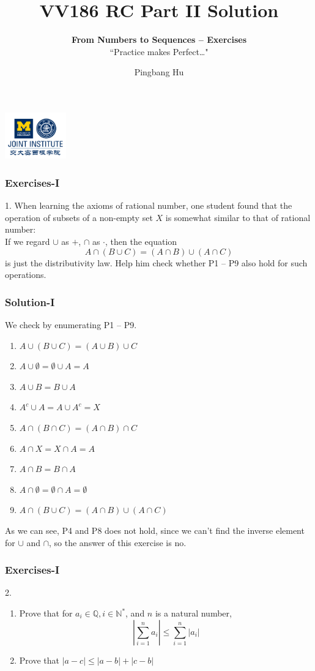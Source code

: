 \documentclass[12pt, t]{beamer}
\title{VV186 RC Part II Solution}
\subtitle{\textbf{From Numbers to Sequences -- Exercises}\\``Practice makes Perfect\dots"}
\institute[UM-SJTU JI]{University of Michigan-Shanghai Jiao Tong University Joint Institute}
\author{Pingbang Hu}
\renewcommand{\emph}[1]{{\color{Turquoise3}\textsl{#1}}}
\begin{document}
\begin{frame}
    \titlepage
    \begin{center}
        \includegraphics[height=2cm]{Figures/logo/logo2.png}
    \end{center}
\end{frame}

\begin{frame}
    \frametitle{Exercises-I}
1. When learning the axioms of rational number, one student found that the operation of subsets of a non-empty 
set $X$ is somewhat similar to that of rational number:\\
\vspace{1em}
If we regard $\cup$ as $+$, $\cap$ as $\cdot$, then the equation 
\begin{equation*}
    A\cap(B\cup C)=(A\cap B)\cup(A\cap C)
\end{equation*}
is just the distributivity law. Help him  check whether P1 -- P9 also hold for such operations.
\end{frame}

\begin{frame}
    \frametitle{Solution-I}
We check by enumerating P1 -- P9.
\begin{enumerate}
    \item $A\cup(B\cup C) = (A\cup B)\cup C$
    \item $A\cup \emptyset =\emptyset \cup A=A$
    \item $A\cup B=B\cup A$
    \item \emph{$A^c\cup A=A\cup A^c=X$}
    \item $A\cap(B\cap C) = (A\cap B)\cap C$
    \item $A\cap X = X\cap A=A$
    \item $A\cap B=B\cap A $
    \item \emph{$A\cap \emptyset=\emptyset \cap A=\emptyset$}
    \item $A\cap (B\cup C)=(A\cap B)\cup (A\cap C)$
\end{enumerate}
As we can see, P4 and P8 does not hold, since we can't find the inverse element for $\cup$ and $\cap$, so the answer of this 
exercise is no.
\end{frame}

\begin{frame}
    \frametitle{Exercises-I}
2.
\begin{enumerate}
    \item Prove that for $a_i\in \mathbb{Q}, i\in \mathbb{N^*}$, and $n$ is a natural number, 
        \begin{equation*}
            |\sum^n_{i=1}a_i|\leq\sum^n_{i=1}|a_i|
        \end{equation*}
    \item Prove that $|a-c|\leq |a-b| +|c-b|$
\end{enumerate}
\end{frame}
\end{document}
